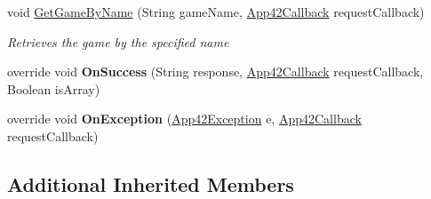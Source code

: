 \begin{DoxyCompactItemize}
void \hyperlink{classcom_1_1shephertz_1_1app42_1_1paas_1_1sdk_1_1windows_1_1game_1_1_game_service_aaaaf7dae5d5fb4c2ce427dde0ac767a3}{Get\+Game\+By\+Name} (String game\+Name, \hyperlink{interfacecom_1_1shephertz_1_1app42_1_1paas_1_1sdk_1_1windows_1_1_app42_callback}{App42\+Callback} request\+Callback)
\begin{DoxyCompactList}\small\item\em Retrieves the game by the specified name \end{DoxyCompactList}\item 
\hypertarget{classcom_1_1shephertz_1_1app42_1_1paas_1_1sdk_1_1windows_1_1game_1_1_game_service_ad2d7fdb79d7451be1b5a0021bcc12c0a}{override void {\bfseries On\+Success} (String response, \hyperlink{interfacecom_1_1shephertz_1_1app42_1_1paas_1_1sdk_1_1windows_1_1_app42_callback}{App42\+Callback} request\+Callback, Boolean is\+Array)}\label{classcom_1_1shephertz_1_1app42_1_1paas_1_1sdk_1_1windows_1_1game_1_1_game_service_ad2d7fdb79d7451be1b5a0021bcc12c0a}

\item 
\hypertarget{classcom_1_1shephertz_1_1app42_1_1paas_1_1sdk_1_1windows_1_1game_1_1_game_service_ae88657f6b706340936474f026e0424d3}{override void {\bfseries On\+Exception} (\hyperlink{classcom_1_1shephertz_1_1app42_1_1paas_1_1sdk_1_1windows_1_1_app42_exception}{App42\+Exception} e, \hyperlink{interfacecom_1_1shephertz_1_1app42_1_1paas_1_1sdk_1_1windows_1_1_app42_callback}{App42\+Callback} request\+Callback)}\label{classcom_1_1shephertz_1_1app42_1_1paas_1_1sdk_1_1windows_1_1game_1_1_game_service_ae88657f6b706340936474f026e0424d3}

\end{DoxyCompactItemize}
\subsection*{Additional Inherited Members}


